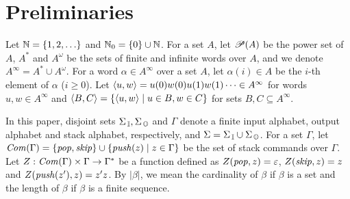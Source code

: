 \section{Preliminaries}
Let $\mathbb{N}=\{1,2,\ldots\}$ and $\mathbb{N}_0=\{0\} \cup \mathbb{N}$.
For a set $A$, let $\mathscr{P}(A)$ be the power set of $A$,
$A^*$ and $A^\omega$ be the sets of finite and infinite words over $A$,
and we denote $A^\infty = A^* \cup A^\omega$.
For a word $\alpha\in A^\infty$ over a set $A$,
let $\alpha(i)\in A$ be the $i$-th element of $\alpha$ ($i\geq 0$).
Let $\langle u, w\rangle = u(0)w(0)u(1)w(1)\cdots \in A^\infty$ for words $u,w\in A^\infty$ and $\langle B, C\rangle = \{\langle u, w\rangle\mid u\in B, w\in C\}$ for sets $B, C\subseteq A^\infty$.

In this paper, disjoint sets $\Sigma_{\, \mathbb{I}}, \Sigma_{\, \mathbb{O}}$ and $\Gamma$ denote
a finite input alphabet, output alphabet and stack alphabet, respectively,
and $\Sigma = \Sigma_{\, \mathbb{I}} \cup \Sigma_{\, \mathbb{O}}$.
For a set $\Gamma$, let $\mathit{Com}(\Gamma) = \{\mathit{pop},\mathit{skip}\}\cup\{\mathit{push}(z)\mid z\in \Gamma\}$ be the set of stack commands over $\Gamma$.
Let $Z:\mathit{Com}(\Gamma)\times \Gamma \to \Gamma^*$ be a function defined as $Z(\mathit{pop},z)=\varepsilon$, $Z(\mathit{skip},z)=z$ and $Z(\mathit{push}(z'),z)=z'z$.
By $|\beta|$, we mean the cardinality of $\beta$ if $\beta$ is a set
and the length of $\beta$ if $\beta$ is a finite sequence.

